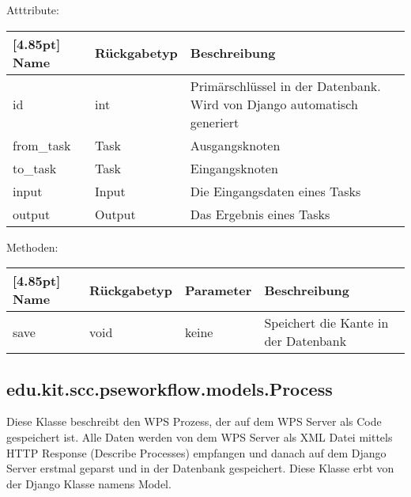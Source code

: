     			Atttribute:
    			\begin{center}
    				\setlength\tabcolsep{5pt}
    				\renewcommand{\arraystretch}{1.5}
    				
    				\begin{tabularx}{\textwidth}{|l|l|X|}
    					\hline
    					\rowcolor[gray]{0.75}[4.85pt]
    					Name & Rückgabetyp & Beschreibung \\ \hline 
    	           		id & int & Primärschlüssel in der Datenbank. Wird von Django automatisch generiert \\ \hline
    	           		from\_task & Task & Ausgangsknoten \\ \hline
    	           	    to\_task & Task & Eingangsknoten \\ \hline
    	           		input & Input & Die Eingangsdaten eines Tasks\\ \hline
    	           		output & Output & Das Ergebnis eines Tasks \\
    	           		
    	           		\hline
    				\end{tabularx}
    			\end{center}
    			
    			Methoden:
    			\begin{center}
    				\setlength\tabcolsep{5pt}
    				\renewcommand{\arraystretch}{1.5}
    				
    				\begin{tabularx}{\textwidth}{|l|l|l|X|}
    					\hline
    					\rowcolor[gray]{0.75}[4.85pt]
    					Name & Rückgabetyp & Parameter & Beschreibung \\ \hline
    					save & void & keine & Speichert die Kante in der Datenbank\\ 
    					\hline
    				\end{tabularx}
    			\end{center}
    			
    			
    
		\subsection{edu.kit.scc.pseworkflow.models.Process}
			Diese Klasse beschreibt den WPS Prozess, der auf dem WPS Server als Code gespeichert ist. Alle Daten werden von dem WPS Server als XML Datei mittels HTTP Response (Describe Processes) empfangen und danach auf dem Django Server erstmal geparst und in der Datenbank gespeichert. \newline
			Diese Klasse erbt von der Django Klasse namens \glqq Model\grqq .
			

